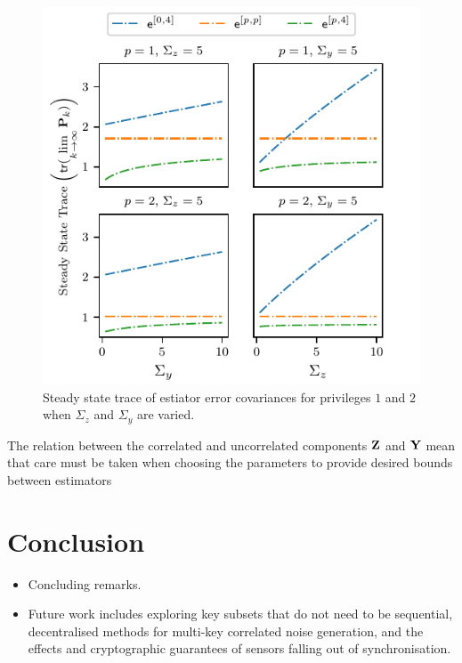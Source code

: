 \documentclass[conference]{IEEEtran}
\theoremstyle{definition}
\theoremstyle{remark}
\begin{document}
\begin{figure}[htbp]
  \centering
  \includegraphics{figures/trace_params.pdf}
  \caption{Steady state trace of estiator error covariances for privileges $1$ and $2$ when $\Sigma_z$ and $\Sigma_y$ are varied.}
  \label{fig:trace_params}
\end{figure}

The relation between the correlated and uncorrelated components ${{\mathbf{Z}}}$ and ${{\mathbf{Y}}}$ mean that care must be taken when choosing the parameters to provide desired bounds between estimators

% 
%                                               
%                                               
%                                               
% 

\section{Conclusion}\label{sec:conc}
\begin{itemize}
  \item Concluding remarks.
  \item Future work includes exploring key subsets that do not need to be sequential, decentralised methods for multi-key correlated noise generation, and the effects and cryptographic guarantees of sensors falling out of synchronisation.
\end{itemize}
\end{document}
